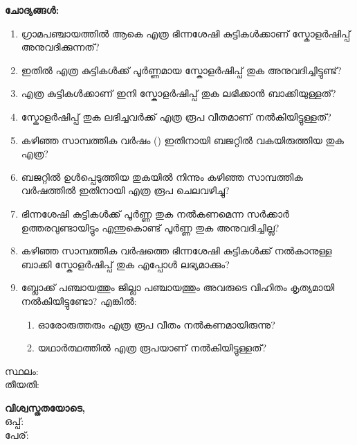 \documentclass[12pt,a4paper]{article}
\begin{document}
	\vspace{0.2cm}
	
	\noindent
	\textbf{ചോദ്യങ്ങൾ:}
	\begin{enumerate}
		\setlength{\itemsep}{1pt}
		\setlength{\parskip}{0pt}
		\setlength{\parsep}{0pt}
		\setlength{\topsep}{0pt}
		\setlength{\partopsep}{0pt}
		\item \makebox[6cm]{\dotfill} ഗ്രാമപഞ്ചായത്തിൽ ആകെ എത്ര ഭിന്നശേഷി കുട്ടികൾക്കാണ് സ്കോളർഷിപ്പ് അനുവദിക്കുന്നത്?
		\item ഇതിൽ എത്ര കുട്ടികൾക്ക് പൂർണ്ണമായ സ്കോളർഷിപ്പ് തുക അനുവദിച്ചിട്ടുണ്ട്?
		\item എത്ര കുട്ടികൾക്കാണ് ഇനി സ്കോളർഷിപ്പ് തുക ലഭിക്കാൻ ബാക്കിയുള്ളത്?
		\item സ്കോളർഷിപ്പ് തുക ലഭിച്ചവർക്ക് എത്ര രൂപ വീതമാണ് നൽകിയിട്ടുള്ളത്?
		\item കഴിഞ്ഞ സാമ്പത്തിക വർഷം (\makebox[2cm]{\dotfill}) ഇതിനായി ബജറ്റിൽ വകയിരുത്തിയ തുക എത്ര?
		\item ബജറ്റിൽ ഉൾപ്പെടുത്തിയ തുകയിൽ നിന്നും കഴിഞ്ഞ സാമ്പത്തിക വർഷത്തിൽ ഇതിനായി എത്ര രൂപ ചെലവഴിച്ചു?
		\item ഭിന്നശേഷി കുട്ടികൾക്ക് പൂർണ്ണ തുക നൽകണമെന്ന സർക്കാർ ഉത്തരവുണ്ടായിട്ടും എന്തുകൊണ്ട് പൂർണ്ണ തുക അനുവദിച്ചില്ല?
		\item കഴിഞ്ഞ സാമ്പത്തിക വർഷത്തെ ഭിന്നശേഷി കുട്ടികൾക്ക് നൽകാനുള്ള ബാക്കി സ്കോളർഷിപ്പ് തുക എപ്പോൾ ലഭ്യമാക്കും?
		\item ബ്ലോക്ക് പഞ്ചായത്തും ജില്ലാ പഞ്ചായത്തും അവരുടെ വിഹിതം കൃത്യമായി നൽകിയിട്ടുണ്ടോ? എങ്കിൽ:
		\begin{enumerate}
			\setlength{\itemsep}{0pt}
			\setlength{\parskip}{0pt}
			\setlength{\parsep}{0pt}
			\setlength{\topsep}{0pt}
			\item[a)] ഓരോരുത്തരും എത്ര രൂപ വീതം നൽകണമായിരുന്നു?
			\item[b)] യഥാർത്ഥത്തിൽ എത്ര രൂപയാണ് നൽകിയിട്ടുള്ളത്?
		\end{enumerate}
	\end{enumerate}
	
	\vspace{0.6cm}
	
	\noindent
	\begin{minipage}[t]{0.45\textwidth}
		സ്ഥലം: \dotfill\null \\[0.15cm]
		തീയതി: \dotfill\null
	\end{minipage}
	\hfill
	\begin{minipage}[t]{0.45\textwidth}
		\raggedleft
		\textbf{വിശ്വസ്തതയോടെ,} \\[0.5cm]
		ഒപ്പ്: \dotfill\null \\[0.15cm]
		പേര്: \dotfill\null
	\end{minipage}
	
\end{document}

